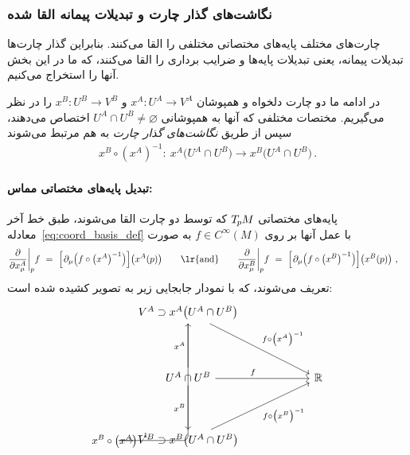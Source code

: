 \subsubsection{نگاشت‌های گذار چارت و تبدیلات پیمانه القا شده}
\label{apx:chart_transition_induced_gauge_trafos}

چارت‌های مختلف پایه‌های مختصاتی مختلفی را القا می‌کنند.
بنابراین گذار چارت‌ها تبدیلات پیمانه، یعنی تبدیلات پایه‌ها و ضرایب برداری را القا می‌کنند، که ما در این بخش آنها را استخراج می‌کنیم.

در ادامه ما دو چارت دلخواه و همپوشان $x^A: U^A \to V^A$ و $x^B: U^B\to V^B$ را در نظر می‌گیریم.
مختصات مختلفی که آنها به همپوشانی $U^A \cap U^B \neq \varnothing$ اختصاص می‌دهند، سپس از طریق \emph{نگاشت‌های گذار چارت} به هم مرتبط می‌شوند
\begin{align}\label{eq:chart_transition_fct}
	x^B\circ\left(x^A\right)^{-1} \!:\ x^A\big(U^A\cap U^B\big)\to x^B\big(U^A\cap U^B\big) \,.
\end{align}



\paragraph{تبدیل پایه‌های مختصاتی مماس:}
پایه‌های مختصاتی $T_{\mkern-1.5mu p}\mkern-.5muM$ که توسط دو چارت القا می‌شوند، طبق خط آخر معادله~\eqref{eq:coord_basis_def} با عمل آنها بر روی $f \in C^\infty(M)$ به صورت
\begin{align}
	\frac{\partial}{\partial x^A_\mu} \bigg|_p f
	\ =\ \Big[\mkern1.5mu \partial_\mu \pig(f \circ \big(x^A\big)^{-1} \pig)\Big] \big(x^A(p)\big)
	\qquad \text{\lr{and}} \qquad
	\frac{\partial}{\partial x^B_\mu} \bigg|_p f
	\ =\ \Big[\mkern1.5mu \partial_\mu \pig(f \circ \big(x^B\big)^{-1} \pig)\Big] \big(x^B(p)\big) \ ,
	\quad
\end{align}
تعریف می‌شوند، که با نمودار جابجایی زیر به تصویر کشیده شده است:
\begin{equation}\label{cd:scalar_field_chart_expressions}
	\begin{tikzcd}[row sep=4.em, column sep=6.em] %
		V^A \supset x^A \big( U^A \cap U^B \big)
		\arrow[rd, "{f\circ \big(x^A\big)^{-1}}"]
		\arrow[dd, rounded corners, to path={ 
			|- node[left, pos=.75]{\small$x^B \circ \big(x^A\big)^{-1}$} ([xshift=-3.5ex]\tikztotarget.west)
			-- (\tikztotarget.west)
		}]
		\\
		U^A \cap U^B
		\arrow[r, pos=.4, "f"]
		\arrow[u, "x^A"]
		\arrow[d, "x^B"']
		&
		\R
		\\
		V^B \supset x^B \big( U^A \cap U^B \big)
		\arrow[ru, "{f\circ \big(x^B\big)^{-1}}"']
	\end{tikzcd}
\end{equation}

